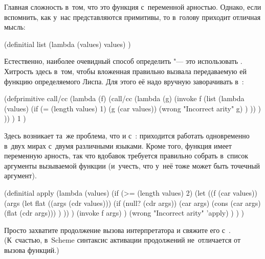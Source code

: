 
Главная сложность  в~том, что это функция с~переменной арностью.
Однако, если вспомнить, как у~нас представляются примитивы, то в~голову приходит
отличная мысль:

\begin{code:lisp}
(definitial list
  (lambda (values) values) )
\end{code:lisp}



Естественно, наиболее очевидный способ определить  "--- это
использовать . Хитрость здесь в~том, чтобы вложенная 
правильно вызвала передаваемую ей функцию определяемого Лиспа. Для этого её
надо вручную заворачивать в~:

\begin{code:lisp}
(defprimitive call/cc
  (lambda (f)
    (call/cc (lambda (g)
               (invoke f
                (list (lambda (values)
                        (if (= (length values) 1)
                            (g (car values))
                            (wrong "Incorrect arity" g) ) )) ) )) )
  1 )
\end{code:lisp}



Здесь возникает та~же проблема, что и с~: приходится работать
одновременно в~двух мирах с~двумя различными языками. Кроме того, функция
 имеет переменную арность, так что вдобавок требуется правильно
собрать в~список аргументы вызываемой функции (и~учесть, что у~неё тоже может
быть точечный аргумент).

\begin{code:lisp}
(definitial apply
  (lambda (values)
    (if (>= (length values) 2)
        (let ((f (car values))
              (args (let flat ((args (cdr values)))
                      (if (null? (cdr args))
                          (car args)
                          (cons (car args) (flat (cdr args))) ) )) )
          (invoke f args) )
        (wrong "Incorrect arity" 'apply) ) ) )
\end{code:lisp}



Просто захватите продолжение вызова интерпретатора и свяжите его с~.
(К~счастью, в~Scheme синтаксис активации продолжений не~отличается от вызова
функций.)

